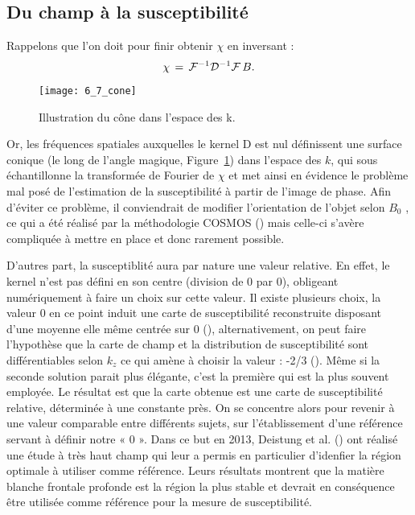 {\subsection{Du champ à la susceptibilité}
\label{sec:champsusc}
Rappelons que l’on doit pour finir obtenir $\chi$ en inversant :
\begin{equation}
\chi\,=\,{\cal F}^{-1}{\cal D}^{-1}{\cal F}\,B.
\end{equation}
\begin{figure}[!t]
\centering
\texttt{[image: 6\_7\_cone]}
\caption{Illustration du cône
dans l'espace des k.}
\label{fig:6_7_cone}	
\end{figure}
Or, les fréquences spatiales auxquelles le kernel D est nul définissent une
surface conique (le long de l’angle magique, Figure~\ref{fig:6_7_cone}) dans l’espace des
$k$, qui sous échantillonne la transformée de Fourier de $\chi$ et met ainsi en
évidence le problème mal posé de l’estimation de la susceptibilité à partir
de l’image de phase. Afin d’éviter ce problème, il conviendrait de modifier
l’orientation de l’objet selon $B_0$ , ce qui a été réalisé par la méthodologie COSMOS (\cite{Liu2009b}) mais celle-ci s’avère compliquée à mettre en place et donc rarement possible.

D’autres part, la susceptiblité aura par nature une valeur relative. En effet, le kernel n’est pas
défini en son centre (division de 0 par 0), obligeant numériquement à faire un choix sur cette valeur.
Il existe plusieurs choix, la valeur 0 en ce point induit une carte de susceptibilité reconstruite disposant
d’une moyenne elle même centrée sur 0 (\cite{DeRochefort2010}), alternativement, on peut faire l’hypothèse que la carte
de champ et la distribution de susceptibilité sont différentiables selon $k_z$ ce qui amène à choisir la
valeur : -2/3 (\cite{Li2011}). Même si la seconde solution parait plus élégante, c’est la première qui est la plus
souvent employée. Le résultat est que la carte obtenue est une carte de susceptibilité relative,
déterminée à une constante près. On se concentre alors pour revenir à une valeur comparable entre
différents sujets, sur l’établissement d’une référence servant à définir notre « 0 ». Dans ce but en 2013,
Deistung et al. (\cite{Deistung2013}) ont réalisé une étude à très haut champ qui leur a permis en particulier d’idenfier
la région optimale à utiliser comme référence. Leurs résultats montrent que la matière blanche
frontale profonde est la région la plus stable et devrait en conséquence être utilisée comme référence
pour la mesure de susceptibilité.

}
